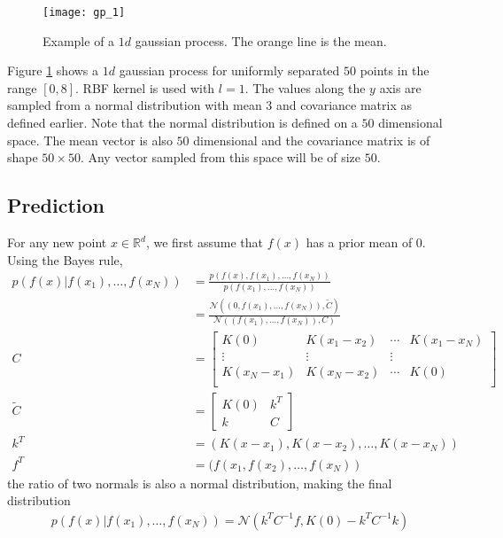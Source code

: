 \documentclass[../../statistical_learning_notes.tex]{subfiles}
\begin{document}
\begin{figure}[h]
\texttt{[image: gp\_1]}
\centering
\caption{Example of a $1d$ gaussian process. The orange line is the mean.}
\label{fig:gp_1} %
\end{figure}

Figure \ref{fig:gp_1} shows a $1d$ gaussian process for uniformly separated $50$ points in the range $[0,8]$. RBF kernel is used with $l = 1$. The values along the $y$ axis are sampled from a normal distribution with mean $3$ and covariance matrix as defined earlier. Note that the normal distribution is defined on a $50$ dimensional space. The mean vector is also $50$ dimensional and the covariance matrix is of shape $50 \times 50$. Any vector sampled from this space will be of size $50$.

\subsection{Prediction}
For any new point $x \in \mathbb{R}^{d}$, we first assume that $f(x)$ has a prior mean of $0$. Using the Bayes rule,
\begin{align*}
    p(f(x) | f(x_{1}), \ldots, f(x_{N})) &= \frac{p(f(x),f(x_{1}), \ldots, f(x_{N}))}{p(f(x_{1}), \ldots, f(x_{N}))}\\
    &= \frac{\mathcal{N}((0,f(x_{1}),\ldots,f(x_{N})),\tilde{C})}{\mathcal{N}((f(x_{1}),\ldots,f(x_{N})), C)}\\
    C &= \begin{bmatrix} K(0) &K(x_{1} - x_{2}) &\cdots &K(x_{1} - x_{N})\\ \vdots &\vdots &\vdots\\ K(x_{N} - x_{1}) &K(x_{N} - x_{2}) &\cdots &K(0)\\ \end{bmatrix}\\
    \tilde{C} &= \begin{bmatrix} K(0) &k^{T}\\ k &C \end{bmatrix}\\
    k^{T} &= (K(x - x_{1}), K(x - x_{2}), \ldots, K(x - x_{N}))\\
    f^{T} &= (f(x_{1}, f(x_{2}), \ldots, f(x_{N}))
\end{align*}
the ratio of two normals is also a normal distribution, making the final distribution
\begin{align*}
    p(f(x) | f(x_{1}), \ldots, f(x_{N})) = \mathcal{N}(k^{T}C^{-1}f, K(0) - k^{T}C^{-1}k)
\end{align*}
\end{document}
